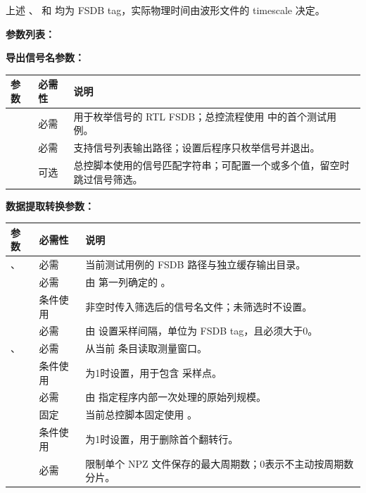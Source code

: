 上述 、 和  均为 FSDB tag，实际物理时间由波形文件的 timescale 决定。

\textbf{参数列表：}

\textbf{导出信号名参数：}
\begin{longtable}{L{0.27\textwidth}L{0.14\textwidth}L{0.46\textwidth}}
\toprule 参数 & 必需性 & 说明 \\ \midrule
{} & 必需 & 用于枚举信号的 RTL FSDB；总控流程使用  中的首个测试用例。 \\
 & 必需 & 支持信号列表输出路径；设置后程序只枚举信号并退出。 \\
 & 可选 & 总控脚本使用的信号匹配字符串；可配置一个或多个值，留空时跳过信号筛选。 \\
\bottomrule
\end{longtable}

\textbf{数据提取转换参数：}
\begin{longtable}{L{0.30\textwidth}L{0.14\textwidth}L{0.43\textwidth}}
\toprule 参数 & 必需性 & 说明 \\ \midrule
{}、 & 必需 & 当前测试用例的 FSDB 路径与独立缓存输出目录。 \\
 & 必需 & 由  第一列确定的 。 \\
 & 条件使用 &  非空时传入筛选后的信号名文件；未筛选时不设置。 \\
 & 必需 & 由  设置采样间隔，单位为 FSDB tag，且必须大于0。 \\
、 & 必需 & 从当前  条目读取测量窗口。 \\
 & 条件使用 &  为1时设置，用于包含  采样点。 \\
 & 必需 & 由  指定程序内部一次处理的原始列规模。 \\
 & 固定 & 当前总控脚本固定使用 。 \\
 & 条件使用 &  为1时设置，用于删除首个翻转行。 \\
 & 必需 & 限制单个 NPZ 文件保存的最大周期数；0表示不主动按周期数分片。 \\
\bottomrule
\end{longtable}

